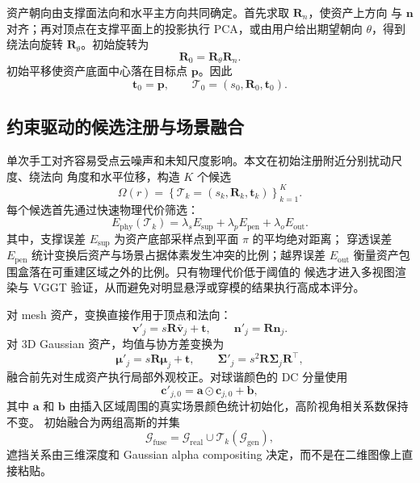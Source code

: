资产朝向由支撑面法向和水平主方向共同确定。首先求取 $\mathbf{R}_{n}$，使资产上方向
与 $\mathbf{n}$ 对齐；再对顶点在支撑平面上的投影执行 PCA，或由用户给出期望朝向
$\theta$，得到绕法向旋转 $\mathbf{R}_{\theta}$。初始旋转为
\begin{equation}
  \mathbf{R}_0=\mathbf{R}_{\theta}\mathbf{R}_{n}.
\end{equation}
初始平移使资产底面中心落在目标点 $\mathbf{p}$。因此
\begin{equation}
  \mathbf{t}_0=\mathbf{p},\qquad
  \mathcal{T}_0=(s_0,\mathbf{R}_0,\mathbf{t}_0).
\end{equation}

\subsection{约束驱动的候选注册与场景融合}

单次手工对齐容易受点云噪声和未知尺度影响。本文在初始注册附近分别扰动尺度、绕法向
角度和水平位移，构造 $K$ 个候选
\begin{equation}
  \Omega(r)=
  \left\{
  \mathcal{T}_k=(s_k,\mathbf{R}_k,\mathbf{t}_k)
  \right\}_{k=1}^{K}.
\end{equation}
每个候选首先通过快速物理代价筛选：
\begin{equation}
  E_{\mathrm{phy}}(\mathcal{T}_k)
  =\lambda_s E_{\mathrm{sup}}
  +\lambda_p E_{\mathrm{pen}}
  +\lambda_o E_{\mathrm{out}}.
\end{equation}
其中，支撑误差 $E_{\mathrm{sup}}$ 为资产底部采样点到平面 $\pi$ 的平均绝对距离；
穿透误差 $E_{\mathrm{pen}}$ 统计变换后资产与场景占据体素发生冲突的比例；越界误差
$E_{\mathrm{out}}$ 衡量资产包围盒落在可重建区域之外的比例。只有物理代价低于阈值的
候选才进入多视图渲染与 VGGT 验证，从而避免对明显悬浮或穿模的结果执行高成本评分。

对 mesh 资产，变换直接作用于顶点和法向：
\begin{equation}
  \mathbf{v}'_j=s\mathbf{R}\bar{\mathbf{v}}_j+\mathbf{t},
  \qquad
  \mathbf{n}'_j=\mathbf{R}\mathbf{n}_j.
\end{equation}
对 3D Gaussian 资产，均值与协方差变换为
\begin{equation}
  \boldsymbol{\mu}'_j=s\mathbf{R}\boldsymbol{\mu}_j+\mathbf{t},
  \qquad
  \boldsymbol{\Sigma}'_j
  =s^2\mathbf{R}\boldsymbol{\Sigma}_j\mathbf{R}^{\top},
\end{equation}
融合前先对生成资产执行局部外观校正。对球谐颜色的 DC 分量使用
\begin{equation}
  \mathbf c'_{j,0}=\mathbf a\odot\mathbf c_{j,0}+\mathbf b,
\end{equation}
其中 $\mathbf a$ 和 $\mathbf b$ 由插入区域周围的真实场景颜色统计初始化，高阶视角相关系数保持不变。
初始融合为两组高斯的并集
\begin{equation}
  \mathcal G_{\mathrm{fuse}}=
  \mathcal G_{\mathrm{real}}\cup\mathcal T_k(\mathcal G_{\mathrm{gen}}),
\end{equation}
遮挡关系由三维深度和 Gaussian alpha compositing 决定，而不是在二维图像上直接粘贴。

